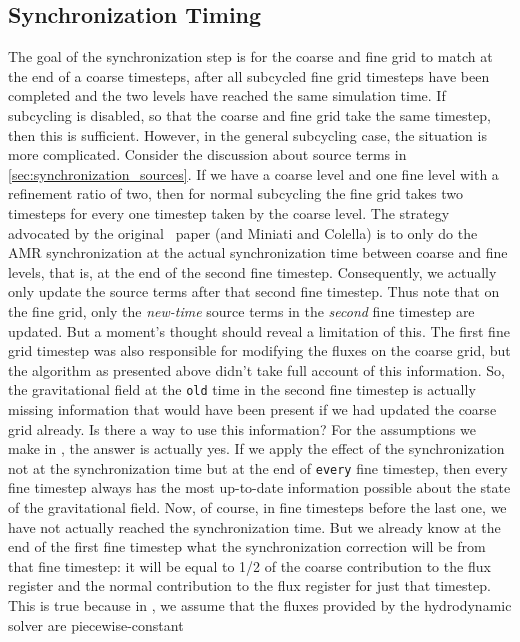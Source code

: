 \subsection{Synchronization Timing}
\label{sec:synchronization_timing}

The goal of the synchronization step is for the coarse and fine grid to
match at the end of a coarse timesteps, after all subcycled fine grid
timesteps have been completed and the two levels have reached the same
simulation time. If subcycling is disabled, so that the coarse and fine
grid take the same timestep, then this is sufficient. However, in the
general subcycling case, the situation is more complicated. Consider the
discussion about source terms in \ref{sec:synchronization_sources}.  If
we have a coarse level and one fine level with a refinement ratio of
two, then for normal subcycling the fine grid takes two timesteps for
every one timestep taken by the coarse level. The strategy advocated by
the original \castro\ paper (and Miniati and Colella) is to only do the
AMR synchronization at the actual synchronization time between coarse
and fine levels, that is, at the end of the second fine timestep.
Consequently, we actually only update the source terms after that second
fine timestep. Thus note that on the fine grid, only the {\it new-time}
source terms in the {\it second} fine timestep are updated. But a
moment's thought should reveal a limitation of this. The first fine grid
timestep was also responsible for modifying the fluxes on the coarse
grid, but the algorithm as presented above didn't take full account of
this information. So, the gravitational field at the {\tt old} time in
the second fine timestep is actually missing information that would have
been present if we had updated the coarse grid already. Is there a way
to use this information? For the assumptions we make in \castro, the
answer is actually yes. If we apply the effect of the synchronization
not at the synchronization time but at the end of {\tt every} fine
timestep, then every fine timestep always has the most up-to-date
information possible about the state of the gravitational field. Now, of
course, in fine timesteps before the last one, we have not actually
reached the synchronization time. But we already know at the end of the
first fine timestep what the synchronization correction will be from
that fine timestep: it will be equal to 1/2 of the coarse contribution
to the flux register and the normal contribution to the flux register
for just that timestep. This is true because in \castro, we assume that
the fluxes provided by the hydrodynamic solver are piecewise-constant
